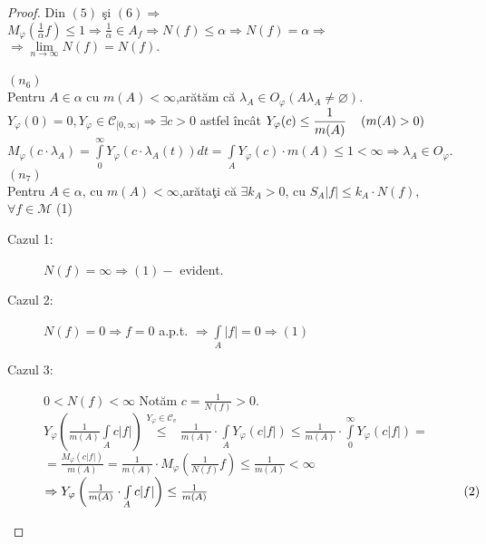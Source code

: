 \documentclass[ a4paper, 12pt]{report}
\theoremstyle{definition}
\theoremstyle{remark}
\numberwithin{equation}{section}
\begin{document}
\begin{proof}
Din $(5)$ \c si $(6) \Rightarrow$  $M_\varphi(\frac{1}{\alpha}f)\leq 1 \Rightarrow \frac{1}{\alpha} \in A_f \Rightarrow N(f) \leq \alpha \Rightarrow N(f) = \alpha \Rightarrow$\\$\Rightarrow \lim\limits_{n \rightarrow \infty} N(f) = N(f).$\\
\\
$(n_6)$
\\
 Pentru $A \in \alpha$ cu $m(A)<\infty$,ar\u at\u am c\u a $\lambda_A \in O_\varphi (A \lambda_A \neq \varnothing).$\\
$Y_\varphi(0) = 0, Y_\varphi \in \mathcal{C}_{{[0,\infty)}} \Rightarrow \exists c>0$ astfel \^inc\^at $Y_\varphi (c) \leq \displaystyle{\frac{1}{m(A)}}\hspace{4mm}  (m(A)>0)$\\
$M_\varphi(c \cdot \lambda_A) = \int\limits_{0}^{\infty} Y_\varphi \left (c \cdot \lambda_A(t)\right ) dt = \int\limits_{A}Y_\varphi (c)\cdot m(A) \leq 1 < \infty \Rightarrow \lambda_A \in O_\varphi.$\\
$(n_7)$\\
 Pentru $A \in \alpha$, cu $m(A)<\infty$,ar\u ata\c ti c\u a $\exists k_A>0$,
 cu $S_A \lvert f  \rvert \leq k_A \cdot N(f),$\\$\forall f \in \mathcal{M}$   \hspace{67mm}  (1)\\
\begin{description}
\item[Cazul 1:] $N(f) = \infty \Rightarrow (1)-$ evident.
\item[Cazul 2:] $N(f) = 0 \Rightarrow f = 0$ a.p.t. $\Rightarrow \int\limits_{A} \lvert f \rvert = 0 \Rightarrow (1)$
\item[Cazul 3:] $0<N(f)<\infty$ Not\u am $c = \frac{1}{N(f)} > 0.$\\
$Y_\varphi \left (\frac{1}{m(A)} \int\limits_{A} c \lvert f \rvert \right ) \stackrel{Y_\varphi \in \mathcal{C}_v}{\leq}\frac{1}{m(A)} \cdot \int\limits_{A} Y_\varphi(c\lvert f \rvert) \leq \frac{1}{m(A)} \cdot \int\limits_{0}^{\infty} Y_\varphi (c \lvert f \rvert) =$\\ $= \frac{M_\varphi(c\lvert f \rvert)}{m(A)} = \frac{1}{m(A)} \cdot M_\varphi(\frac{1}{N(f)}f) \leq \frac{1}{m(A)} < \infty$ \\
$\Rightarrow Y_\varphi \left (\frac{1}{m(A)} \cdot \int\limits_{A} c \lvert f \rvert\right ) \leq \frac{1}{m(A)}  \hspace{71mm}(2)$
\end{description}
\end{proof}
\end{document}
